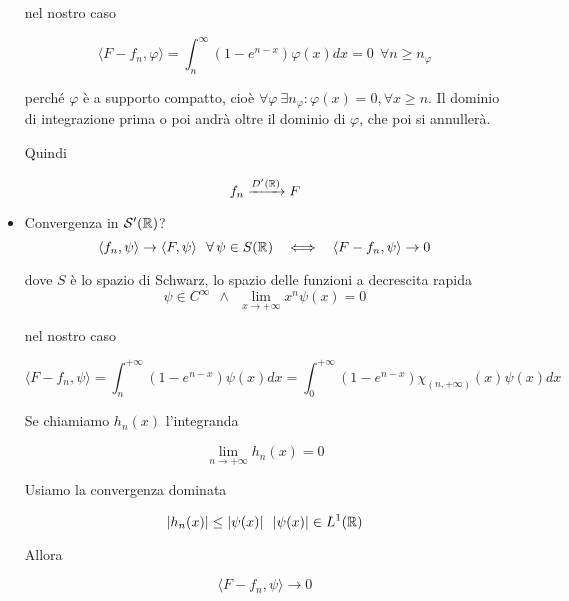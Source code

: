 \begin{itemize}
nel nostro caso

\begin{equation*}
\langle F - f_{n} ,\varphi \rangle = \int ^{\infty }_{n}\left(1 - e^{n - x}\right) \varphi (x)dx = 0\ \ \forall n\geq n_{\varphi }
\end{equation*}

perché $\varphi $ è a supporto compatto, cioè $\forall \varphi \ \exists n_{\varphi } :\varphi (x) = 0,\forall x\geq n$. Il dominio di integrazione prima o poi andrà oltre il dominio di $\varphi $, che poi si annullerà.

Quindi

\begin{equation*}
f_{n}\xrightarrow{D'(\mathbb{R})} F
\end{equation*}
\item Convergenza in $\mathcal{S}  '(\mathbb{R})$?\begin{equation*}
\langle f_{n} ,\psi \rangle \rightarrow \langle F,\psi \rangle \ \ \forall \psi \in S(\RR) \ \ \iff \ \ \langle F - f_{n} ,\psi \rangle \rightarrow 0
\end{equation*}

dove $S$ è lo spazio di Schwarz, lo spazio delle funzioni a decrescita rapida\begin{equation*}
\psi \in C^{\infty } \ \ \land \ \ \lim\limits _{x\rightarrow + \infty } x^{n} \psi (x) = 0
\end{equation*}

nel nostro caso

\begin{equation*}
\langle F - f_{n} ,\psi \rangle = \int ^{ + \infty }_{n}\left(1 - e^{n - x}\right) \psi (x) dx = \int ^{ + \infty }_{0}\left(1 - e^{n - x}\right) \chi _{(n, + \infty)}(x) \psi (x) dx
\end{equation*}

Se chiamiamo $h_{n}(x)$ l'integranda

\begin{equation*}
\lim\limits _{n\rightarrow + \infty } h_{n}(x) = 0
\end{equation*}

Usiamo la convergenza dominata

\begin{equation*}
| h_{n}(x)| \leq | \psi (x)| \ \ | \psi (x)| \in L^{1}(\mathbb{R})
\end{equation*}

Allora

\begin{equation*}
\langle F - f_{n} ,\psi \rangle \rightarrow 0
\end{equation*}
\end{itemize}
